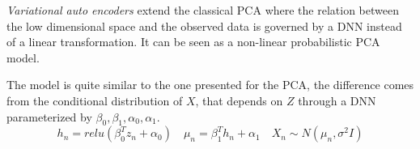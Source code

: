 \emph{Variational auto encoders} extend the classical PCA where the relation between the low dimensional space and the observed data is governed by a DNN instead of a linear transformation.
It can be seen as a non-linear probabilistic PCA model.

The model is quite similar to the one presented for the PCA, the difference comes from the conditional distribution of \(X\), that depends on \(Z\) through a DNN parameterized by \(\beta_{0}, \beta_{1}, \alpha_{0}, \alpha_{1}\).
\[
  h_{n} = relu(\beta_{0}^{T}z_{n} + \alpha_{0}) \quad \mu_{n} = \beta_{1}^{T}h_{n} + \alpha_{1} \quad X_{n} \sim N(\mu_{n}, \sigma^{2}I)
\]
